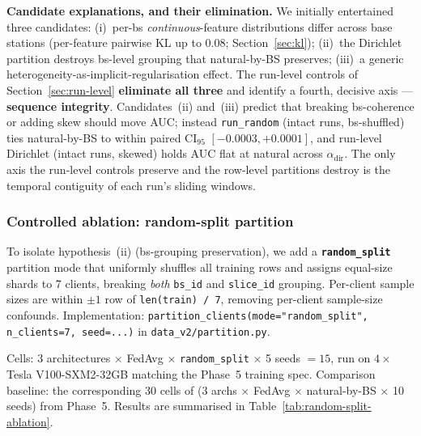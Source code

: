 \documentclass[journal]{IEEEtran}
\newcommand{\alphadir}{\ensuremath{\alpha_{\mathrm{dir}}}}
\begin{document}
\textbf{Candidate explanations, and their elimination.} We initially entertained three candidates: (i)~per-bs \emph{continuous}-feature distributions differ across base stations (per-feature pairwise KL up to $0.08$; Section~\ref{sec:kl}); (ii)~the Dirichlet partition destroys bs-level grouping that natural-by-BS preserves; (iii)~a generic heterogeneity-as-implicit-regularisation effect. The run-level controls of Section~\ref{sec:run-level} \textbf{eliminate all three} and identify a fourth, decisive axis --- \textbf{sequence integrity}. Candidates~(ii) and~(iii) predict that breaking bs-coherence or adding skew should move AUC; instead \lstinline|run_random| (intact runs, bs-shuffled) ties natural-by-BS to within paired CI$_{95}$ $[-0.0003, +0.0001]$, and run-level Dirichlet (intact runs, skewed) holds AUC flat at natural across $\alphadir$. The only axis the run-level controls preserve and the row-level partitions destroy is the temporal contiguity of each run's sliding windows.

\subsubsection{Controlled ablation: random-split partition}\label{sec:ablation}

To isolate hypothesis~(ii) (bs-grouping preservation), we add a \textbf{\lstinline|random_split|} partition mode that uniformly shuffles all training rows and assigns equal-size shards to 7 clients, breaking \emph{both} \lstinline|bs_id| and \lstinline|slice_id| grouping. Per-client sample sizes are within $\pm 1$ row of \lstinline|len(train) / 7|, removing per-client sample-size confounds. Implementation: \lstinline|partition_clients(mode="random_split", n_clients=7, seed=...)| in \lstinline|data_v2/partition.py|.

Cells: 3 architectures $\times$ FedAvg $\times$ \lstinline|random_split| $\times$ 5 seeds $= 15$, run on $4 \times$ Tesla V100-SXM2-32GB matching the Phase~5 training spec. Comparison baseline: the corresponding 30 cells of (3 archs $\times$ FedAvg $\times$ natural-by-BS $\times$ 10 seeds) from Phase~5. Results are summarised in Table~\ref{tab:random-split-ablation}.
\end{document}
